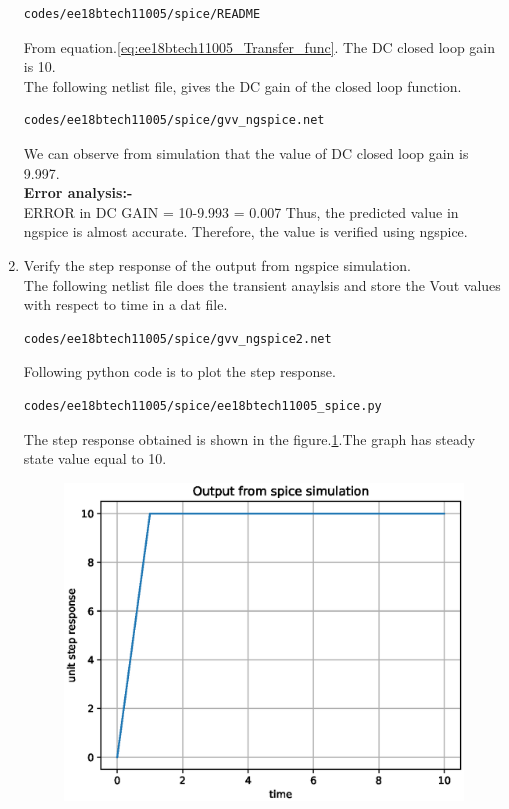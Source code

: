 \begin{enumerate}[label=\arabic*.,ref=\theenumi]
\begin{lstlisting}
codes/ee18btech11005/spice/README
\end{lstlisting}
From equation.\ref{eq:ee18btech11005_Transfer_func}.
The DC closed loop gain is 10.\\
The following netlist file, gives the DC gain of the closed loop function.
\begin{lstlisting}
codes/ee18btech11005/spice/gvv_ngspice.net
\end{lstlisting}
We can observe from simulation that the value of DC closed loop gain is 9.997.\\
\textbf{Error analysis:-}\\
ERROR in DC GAIN = 10-9.993 = 0.007
Thus, the predicted value in ngspice is almost accurate.
Therefore, the value is verified using ngspice.
\item Verify the step response of the output from ngspice simulation.\\
\solution The following netlist file does the transient anaylsis and store the Vout values with respect to time in a dat file. 
\begin{lstlisting}
codes/ee18btech11005/spice/gvv_ngspice2.net
\end{lstlisting}
Following python code is to plot the step response.
\begin{lstlisting}
codes/ee18btech11005/spice/ee18btech11005_spice.py
\end{lstlisting}
The step response obtained is shown in the figure.\ref{fig:ee18btech11005_3}.The graph has steady state value equal to 10.
\begin{figure}[!ht]
\centering
\includegraphics[width=\columnwidth]{./figs/ee18btech11005/ee18btech11005_spice.eps}
\caption{}
\label{fig:ee18btech11005_3}
\end{figure}

\end{enumerate}


